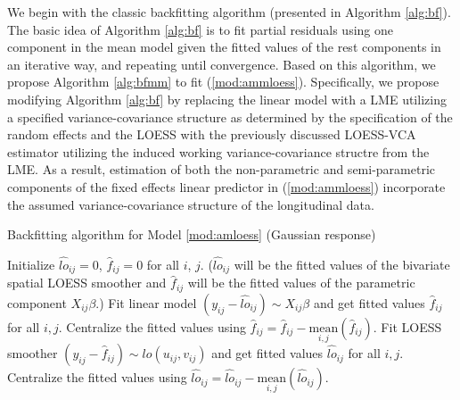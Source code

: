 	We begin with the classic backfitting algorithm (presented in Algorithm \ref{alg:bf}). The basic idea of Algorithm \ref{alg:bf} is to fit partial residuals using one component in the mean model given the fitted values of the rest components in an iterative way, and repeating until convergence. Based on this algorithm, we propose Algorithm \ref{alg:bfmm} to fit (\ref{mod:ammloess}). Specifically, we propose modifying Algorithm \ref{alg:bf} by replacing the linear model with a LME utilizing a specified variance-covariance structure as determined by the specification of the random effects and the LOESS with the previously discussed LOESS-VCA estimator utilizing the induced working variance-covariance structre from the LME. As a result, estimation of both the non-parametric and semi-parametric components of the fixed effects linear predictor in (\ref{mod:ammloess}) incorporate the assumed variance-covariance structure of the longitudinal data. 
	\begin{algorithm}[H]
		\caption{Backfitting algorithm for Model \ref{mod:amloess} (Gaussian response)}
		\label{alg:bf}
		\begin{algorithmic}
			\State Initialize $\hat{lo}_{ij}=0$, $\hat{f}_{ij}=0$ for all $i$, $j$. 
			($\hat{lo}_{ij}$ will be the fitted values of the bivariate spatial LOESS smoother and $\hat{f}_{ij}$ will be the fitted values of the parametric component $X_{ij}\beta$.)
			\State Fit linear model $(y_{ij}-\hat{lo}_{ij})\sim X_{ij}\beta$ and get fitted values $\hat{f}_{ij}$ for all $i,j$. 
			\State Centralize the fitted values using $\hat{f}_{ij}=\hat{f}_{ij}-\underset{i,j} {\text{mean}}(\hat{f}_{ij})$.
			\State Fit LOESS smoother $(y_{ij}-\hat{f}_{ij}) \sim lo(u_{ij},v_{ij})$ and get fitted values $\hat{lo}_{ij}$ for all $i,j$. 
			\State Centralize the fitted values using $\hat{lo}_{ij}=\hat{lo}_{ij}-\underset{i,j} {\text{mean}}(\hat{lo}_{ij})$.
			\EndWhile
		\end{algorithmic}
	\end{algorithm}
